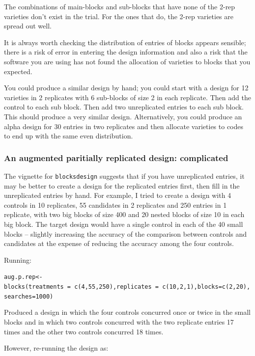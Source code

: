 \documentclass[
]{book}
\begin{document}
The combinations of main-blocks and sub-blocks that have none of the 2-rep varieties don't exist in the trial. For the ones that do, the 2-rep varieties are spread out well.

It is always worth checking the distribution of entries of blocks appears sensible; there is a risk of error in entering the design information and also a risk that the software you are using has not found the allocation of varieties to blocks that you expected.

You could produce a similar design by hand; you could start with a design for 12 varieties in 2 replicates with 6 sub-blocks of size 2 in each replicate. Then add the control to each sub block. Then add two unreplicated entries to each sub block. This should produce a very similar design. Alternatively, you could produce an alpha design for 30 entries in two replicates and then allocate varieties to codes to end up with the same even distribution.

\hypertarget{an-augmented-paritially-replicated-design-complicated}{%
\subsubsection{An augmented paritially replicated design: complicated}\label{an-augmented-paritially-replicated-design-complicated}}

The vignette for \texttt{blocksdesign} suggests that if you have unreplicated entries, it may be better to create a design for the replicated entries first, then fill in the unreplicated entries by hand. For example, I tried to create a design with 4 controls in 10 replicates, 55 candidates in 2 replicates and 250 entries in 1 replicate, with two big blocks of size 400 and 20 nested blocks of size 10 in each big block. The target design would have a single control in each of the 40 small blocks -- slightly increasing the accuracy of the comparison between controls and candidates at the expense of reducing the accuracy among the four controls.

Running:

\texttt{aug.p.rep\textless{}-blocks(treatments\ =\ c(4,55,250),replicates\ =\ c(10,2,1),blocks=c(2,20),searches=1000)}

Produced a design in which the four controls concurred once or twice in the small blocks and in which two controls concurred with the two replicate entries 17 times and the other two controls concurred 18 times.

However, re-running the design as:
\end{document}

